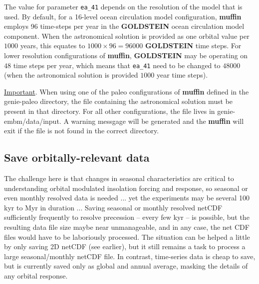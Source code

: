 The value for parameter \texttt{ea\_41} depends on the resolution of the model that is used. By default, for a 16-level ocean circulation model configuration, \textbf{muffin} employs 96  time-steps per year in the \textbf{GOLDSTEIN} ocean circulation model component. When the astronomical solution is provided as one orbital value per \(1000\) years, this equates to \(1000\times96=96000\) \textbf{GOLDSTEIN} time steps. For lower resolution configurations of \textbf{muffin}, \textbf{GOLDSTEIN} may be operating on \(48\) time steps per year, which means that \texttt{ea\_41} need to be changed to \(48000\) (when the astronomical solution is provided \(1000\) year time steps).

\uline{Important}. When using one of the paleo configurations of \textbf{muffin} defined in the \textsf{\footnotesize genie-paleo } directory, the file containing the astronomical solution must be present in that directory. For all other configurations, the file lives in \footnotesize\textsf{genie-embm/data/input}\normalsize. A warning messgage will be generated and the \textbf{muffin} will exit if the file is not found in the correct directory.

%
\newpage
\subsection*{Save orbitally-relevant data}
\vspace{1mm}

The challenge here is that   changes in seasonal characteristics are critical to understanding orbital modulated insolation forcing and response, so seasonal or even monthly resolved data is needed ... yet the  experiments may be several 100 kyr to Myr in duration ... Saving seasonal or monthly resolved netCDF sufficiently frequently to resolve precession -- every few kyr -- is possible, but the resulting data file size maybe near unmanageable, and in any case, the net CDF files would have to be laboriously processed. The situation can be helped a little by only saving 2D netCDF (see earlier), but it still remains a task to process a large seasonal/monthly netCDF file. In contrast, time-series data is cheap to save, but is currently saved only as global and annual average, masking the details of any orbital response.


